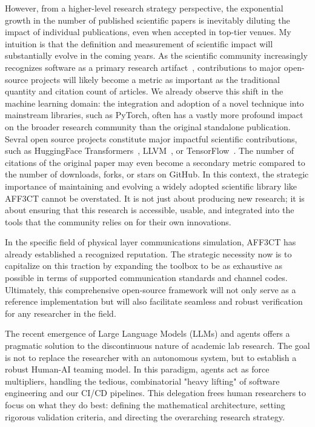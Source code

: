 \documentclass[11pt]{report}
\begin{document}
However, from a higher-level research strategy perspective, the exponential growth in the number of published scientific papers is inevitably diluting the impact of individual publications, even when accepted in top-tier venues. My intuition is that the definition and measurement of scientific impact will substantially evolve in the coming years. As the scientific community increasingly recognizes software as a primary research artifact~\cite{smith2016software}, contributions to major open-source projects will likely become a metric as important as the traditional quantity and citation count of articles. We already observe this shift in the machine learning domain: the integration and adoption of a novel technique into mainstream libraries, such as PyTorch, often has a vastly more profound impact on the broader research community than the original standalone publication. Sevral open source projects constitute major impactful scientific contributions, such as HuggingFace Transformers~\cite{wolf2020transformers}, LLVM~\cite{lattner2004llvm}, or TensorFlow~\cite{abadi2016tensorflow}. The number of citations of the original paper may even become a secondary metric compared to the number of downloads, forks, or stars on GitHub. In this context, the strategic importance of maintaining and evolving a widely adopted scientific library like AFF3CT cannot be overstated. It is not just about producing new research; it is about ensuring that this research is accessible, usable, and integrated into the tools that the community relies on for their own innovations.

In the specific field of physical layer communications simulation, AFF3CT has already established a recognized reputation. The strategic necessity now is to capitalize on this traction by expanding the toolbox to be as exhaustive as possible in terms of supported communication standards and channel codes. Ultimately, this comprehensive open-source framework will not only serve as a reference implementation but will also facilitate seamless and robust verification for any researcher in the field.

The recent emergence of Large Language Models (LLMs) and agents offers a pragmatic solution to the discontinuous nature of academic lab research. The goal is not to replace the researcher with an autonomous system, but to establish a robust Human-AI teaming model. In this paradigm, agents act as force multipliers, handling the tedious, combinatorial "heavy lifting" of software engineering and our CI/CD pipelines. This delegation frees human researchers to focus on what they do best: defining the mathematical architecture, setting rigorous validation criteria, and directing the overarching research strategy.
\end{document}
